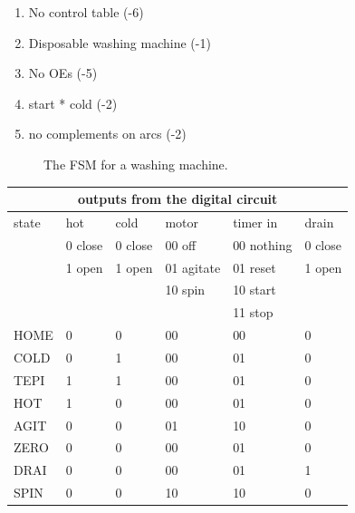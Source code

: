 \begin{enumerate}
\begin{solution}{
	\begin{enumerate}
	\item No control table (-6)
	\item Disposable washing machine (-1)
	\item No OEs (-5)
	\item start * cold (-2)
	\item no complements on arcs (-2)
	\end{enumerate}
\begin{figure}[ht]
\caption{The FSM for a washing machine.}
\end{figure}

\begin{tabular}{|l|||l|l|l|l|l|} \hline
\multicolumn{6}{|c|}{outputs from the digital circuit}			\\ \hline \hline
state & hot     & cold    & motor      & timer in   & drain 	\\ \hline
      & 0 close & 0 close & 00 off     & 00 nothing & 0 close	\\ \hline
      & 1 open  & 1 open  & 01 agitate & 01 reset   & 1 open	\\ \hline
      &		&         & 10 spin    & 10 start   &		\\ \hline 
      &		&         &	       & 11 stop    &		\\ \hline \hline
HOME  &	0	& 0	  & 00	       & 00	    & 0		\\ \hline
COLD  &	0	& 1	  & 00	       & 01	    & 0		\\ \hline
TEPI  &	1	& 1	  & 00	       & 01	    & 0		\\ \hline
HOT   &	1	& 0	  & 00	       & 01	    & 0		\\ \hline
AGIT  &	0	& 0	  & 01	       & 10	    & 0		\\ \hline
ZERO  &	0	& 0	  & 00	       & 01	    & 0		\\ \hline
DRAI  &	0	& 0	  & 00	       & 01	    & 1		\\ \hline
SPIN  &	0	& 0	  & 10	       & 10	    & 0		\\ \hline
\end{tabular}

}
\end{solution}
\end{enumerate}
